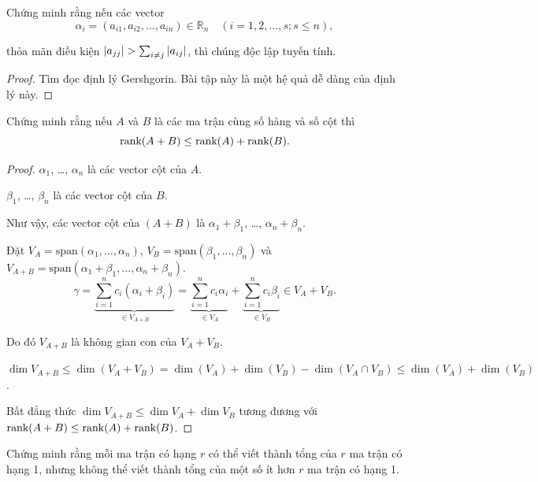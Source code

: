 \begin{exercise}
    Chứng minh rằng nếu các vector
    \[
        \alpha_{i} = (a_{i1}, a_{i2}, \ldots, a_{in})\in\mathbb{R}_{n}\quad (i = 1, 2, \ldots, s; s\le n),
    \]
    
    thỏa mãn điều kiện $\left|{a_{jj}}\right| > \sum_{i\ne j}\left|{a_{ij}}\right|$, thì chúng độc lập tuyến tính.
\end{exercise}

\begin{proof}
    Tìm đọc định lý Gershgorin. Bài tập này là một hệ quả dễ dàng của định lý này.
\end{proof}

\begin{exercise}\label{chapter3:rank-of-sum}
    Chứng minh rằng nếu $A$ và $B$ là các ma trận cùng số hàng và số cột thì
    \[
        \text{rank}(A + B)\le \text{rank}(A) + \text{rank}(B).
    \]
\end{exercise}

\begin{proof}
    $\alpha_{1}$, \ldots, $\alpha_{n}$ là các vector cột của $A$.
    
    $\beta_{1}$, \ldots, $\beta_{n}$ là các vector cột của $B$.
    
    Như vậy, các vector cột của $(A + B)$ là $\alpha_{1} + \beta_{1}$, \ldots, $\alpha_{n} + \beta_{n}$.
    
    Đặt $V_{A} = \text{span}(\alpha_{1}, \ldots, \alpha_{n})$, $V_{B} = \text{span}(\beta_{1}, \ldots, \beta_{n})$ và $V_{A+B} = \text{span}(\alpha_{1}+\beta_{1}, \ldots, \alpha_{n} + \beta_{n})$.
    \[
        \gamma = \underbrace{\sum^{n}_{i=1}c_{i}(\alpha_{i} + \beta_{i})}_{\in V_{A+B}} = \underbrace{\sum^{n}_{i=1}c_{i}\alpha_{i}}_{\in V_{A}} + \underbrace{\sum^{n}_{i=1}c_{i}\beta_{i}}_{\in V_{B}} \in V_{A} + V_{B}.
    \]
    
    Do đó $V_{A+B}$ là không gian con của $V_{A} + V_{B}$.
    
    $\dim V_{A+B}\le \dim(V_{A} + V_{B}) = \dim(V_{A}) + \dim(V_{B}) - \dim(V_{A}\cap V_{B})\le \dim(V_{A}) + \dim(V_{B})$.
    
    Bất đẳng thức $\dim V_{A+B} \le \dim{V_{A}} + \dim{V_{B}}$ tương đương với $\text{rank}(A + B)\le \text{rank}(A) + \text{rank}(B)$.
\end{proof}

\begin{exercise}
    Chứng minh rằng mỗi ma trận có hạng $r$ có thể viết thành tổng của $r$ ma trận có hạng 1, nhưng không thể viết thành tổng của một số ít hơn $r$ ma trận có hạng 1.
\end{exercise}

